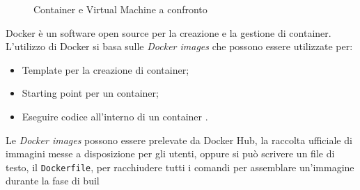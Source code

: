 \begin{figure}[ht]
    \centering
    \caption{Container e Virtual Machine a confronto}
    \label{fig:one}
\end{figure}

Docker è un software open source per la creazione e la gestione di container.\\
L'utilizzo di Docker si basa sulle \emph{Docker images} che possono essere utilizzate per:
\begin{itemize}
\item Template per la creazione di container;
\item Starting point per un container;
\item Eseguire codice all'interno di un container .
\end{itemize}

Le \emph{Docker images} possono essere prelevate da Docker Hub, la raccolta ufficiale di immagini messe a disposizione per gli utenti, oppure si può scrivere un file di testo, il \texttt{Dockerfile}, per racchiudere tutti i comandi per assemblare un'immagine durante la fase di buil


